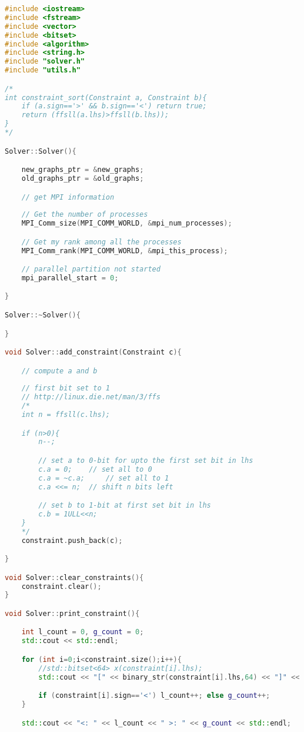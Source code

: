 \documentclass[12pt]{etsu_thesis}
\begin{document}
\begin{lstlisting}[language=C++]
#include <iostream>
#include <fstream>
#include <vector>
#include <bitset>
#include <algorithm>
#include <string.h>
#include "solver.h"
#include "utils.h"

/*
int constraint_sort(Constraint a, Constraint b){
	if (a.sign=='>' && b.sign=='<') return true;
	return (ffsll(a.lhs)>ffsll(b.lhs));
}
*/

Solver::Solver(){

    new_graphs_ptr = &new_graphs;
    old_graphs_ptr = &old_graphs;

    // get MPI information
    
    // Get the number of processes
    MPI_Comm_size(MPI_COMM_WORLD, &mpi_num_processes); 

    // Get my rank among all the processes
    MPI_Comm_rank(MPI_COMM_WORLD, &mpi_this_process);     

    // parallel partition not started
    mpi_parallel_start = 0;

}

Solver::~Solver(){

}

void Solver::add_constraint(Constraint c){

	// compute a and b
	
	// first bit set to 1
	// http://linux.die.net/man/3/ffs
	/*
    int n = ffsll(c.lhs);

	if (n>0){
		n--;

		// set a to 0-bit for upto the first set bit in lhs
		c.a = 0;	// set all to 0
		c.a = ~c.a;		// set all to 1
		c.a <<= n;	// shift n bits left

		// set b to 1-bit at first set bit in lhs
		c.b = 1ULL<<n;
	}
    */
    constraint.push_back(c);

}

void Solver::clear_constraints(){
    constraint.clear();
}

void Solver::print_constraint(){

    int l_count = 0, g_count = 0;
    std::cout << std::endl;

	for (int i=0;i<constraint.size();i++){
		//std::bitset<64> x(constraint[i].lhs);
		std::cout << "[" << binary_str(constraint[i].lhs,64) << "]" << constraint[i].sign << constraint[i].rhs << std::endl;

        if (constraint[i].sign=='<') l_count++; else g_count++;
    }

    std::cout << "<: " << l_count << " >: " << g_count << std::endl;


\end{lstlisting}
\end{document}
